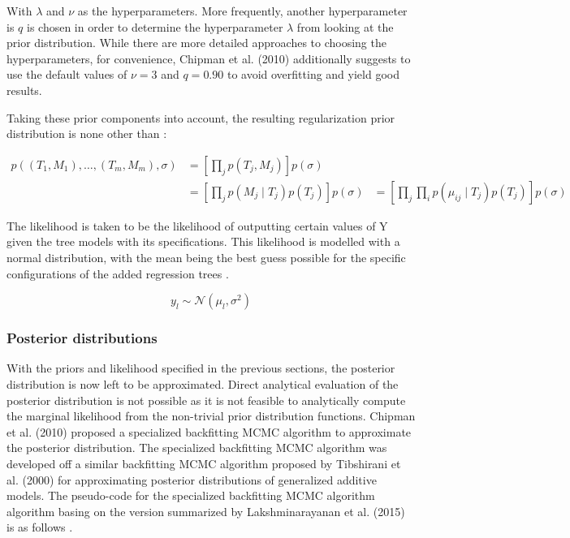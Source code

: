 \documentclass{usiinftr}
\begin{document}
\begin{enumerate}
With $\lambda$ and $\nu$ as the hyperparameters. More frequently, another hyperparameter is $q$ is chosen in order to determine the hyperparameter $\lambda$ from looking at the prior distribution. While there are more detailed approaches to choosing the hyperparameters, for convenience, Chipman et al. (2010) \cite{7} additionally suggests to use the default values of $\nu = 3$ and $q = 0.90$ to avoid overfitting and yield good results.
\end{enumerate}

Taking these prior components into account, the resulting regularization prior distribution is none other 
than \cite{7}:

\begin{equation}
\begin{aligned}
p\left(\left(T_{1}, M_{1}\right), \ldots,\left(T_{m}, M_{m}\right), \sigma\right) &=\left[\prod_{j} p\left(T_{j}, M_{j}\right)\right] p(\sigma) \\
&=\left[\prod_{j} p\left(M_{j} \mid T_{j}\right) p\left(T_{j}\right)\right] p(\sigma)
&= \left[\prod_{j}  \prod_{i} p\left(\mu_{i j} \mid T_{j}\right) p\left(T_{j}\right)\right] p(\sigma)
\end{aligned}
\end{equation}

The likelihood is taken to be the likelihood of outputting certain values of Y given the tree models with its specifications. This likelihood is modelled with a normal distribution, with the mean being the best guess possible for the specific configurations of the added regression trees \cite{7}.

\begin{equation}
y_l \sim \mathcal{N}(\mu_l, \sigma^2)
\end{equation}



\subsubsection{Posterior distributions}
With the priors and likelihood specified in the previous sections, the posterior distribution is now left to be approximated. Direct analytical evaluation of the posterior distribution is not possible as it is not feasible to analytically compute the marginal likelihood from the non-trivial prior distribution functions. Chipman et al. (2010) \cite{7} proposed a specialized backfitting MCMC algorithm to approximate the posterior distribution. The specialized backfitting MCMC algorithm was developed off a similar backfitting MCMC algorithm proposed by Tibshirani et al. (2000) \cite{31} for approximating posterior distributions of generalized additive models. The pseudo-code for the specialized backfitting MCMC algorithm algorithm basing on the version summarized by Lakshminarayanan et al. (2015) is as follows \cite{32}.
\end{document}
